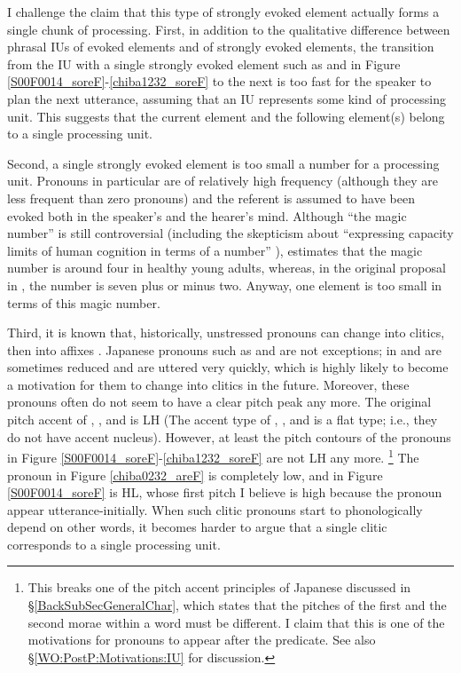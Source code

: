I challenge the claim that this type of strongly evoked element actually forms a single chunk of processing.
First,
in addition to the qualitative difference between phrasal IUs of evoked elements and of strongly evoked elements,
the transition from the IU with a single strongly evoked element such as  and  in Figure \ref{S00F0014_soreF}-\ref{chiba1232_soreF} to the next is too fast for the speaker to plan the next utterance,
assuming that an IU represents some kind of processing unit.
This suggests that the current element and the following element(s) belong to a single processing unit.

Second, a single strongly evoked element is too small a number for a processing unit.
Pronouns in particular are of relatively high frequency (although they are less frequent than zero pronouns) and the referent is assumed to have been evoked both in the speaker's and the hearer's mind.
Although ``the magic number'' is still controversial (including the skepticism about ``expressing capacity limits of human cognition in terms of a number'' \cite[][p.~245]{oberauer07}),
 estimates that the magic number is around four in healthy young adults,
whereas, in the original proposal in ,
the number is seven plus or minus two.
Anyway, one element is too small in terms of this magic number.



Third,
it is known that, historically, unstressed pronouns can change into clitics, then into affixes \cite{givon76}.
Japanese pronouns such as  and  are not exceptions;
 in  and  are sometimes reduced and are uttered very quickly,
which is highly likely to become a motivation for them to change into clitics in the future.
Moreover, these pronouns often do not seem to have a clear pitch peak any more.
The original pitch accent of , , and  is LH
(The accent type of , , and  is a flat type;
i.e., they do not have accent nucleus).
However, at least the pitch contours of the pronouns in Figure \ref{S00F0014_soreF}-\ref{chiba1232_soreF} are not LH any more.%
	\footnote{
	This breaks one of the pitch accent principles of Japanese discussed in \S \ref{BackSubSecGeneralChar},
	which states that the pitches of the first and the second morae within a word must be different.
	I claim that this is one of the motivations for pronouns to appear after the predicate.
	See also \S \ref{WO:PostP:Motivations:IU} for discussion.
	}
The pronoun  in Figure \ref{chiba0232_areF} is completely low,
and  in Figure \ref{S00F0014_soreF} is HL, whose first pitch I believe is high because the pronoun appear utterance-initially.
When such clitic pronouns start to phonologically depend on other words,
it becomes harder to argue that a single clitic corresponds to a single processing unit.

